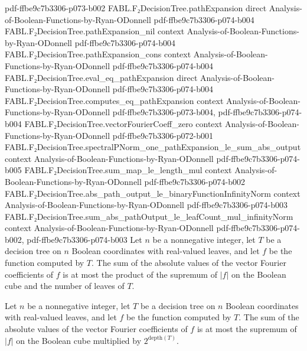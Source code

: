 \begin{theorem}
  {pdf-ffbe9c7b3306-p073-b002}
\proofstep
  {FABL.F₂DecisionTree.pathExpansion}
  {direct}
  {Analysis-of-Boolean-Functions-by-Ryan-ODonnell}
  {pdf-ffbe9c7b3306-p074-b004}
\proofstep
  {FABL.F₂DecisionTree.pathExpansion_nil}
  {context}
  {Analysis-of-Boolean-Functions-by-Ryan-ODonnell}
  {pdf-ffbe9c7b3306-p074-b004}
\proofstep
  {FABL.F₂DecisionTree.pathExpansion_cons}
  {context}
  {Analysis-of-Boolean-Functions-by-Ryan-ODonnell}
  {pdf-ffbe9c7b3306-p074-b004}
\proofstep
  {FABL.F₂DecisionTree.eval_eq_pathExpansion}
  {direct}
  {Analysis-of-Boolean-Functions-by-Ryan-ODonnell}
  {pdf-ffbe9c7b3306-p074-b004}
\proofstep
  {FABL.F₂DecisionTree.computes_eq_pathExpansion}
  {context}
  {Analysis-of-Boolean-Functions-by-Ryan-ODonnell}
  {pdf-ffbe9c7b3306-p073-b004,
    pdf-ffbe9c7b3306-p074-b004}
\proofstep
  {FABL.F₂DecisionTree.vectorFourierCoeff_zero}
  {context}
  {Analysis-of-Boolean-Functions-by-Ryan-ODonnell}
  {pdf-ffbe9c7b3306-p072-b001}
\proofstep
  {FABL.F₂DecisionTree.spectralPNorm_one_pathExpansion_le_sum_abs_output}
  {context}
  {Analysis-of-Boolean-Functions-by-Ryan-ODonnell}
  {pdf-ffbe9c7b3306-p074-b005}
\proofstep
  {FABL.F₂DecisionTree.sum_map_le_length_mul}
  {context}
  {Analysis-of-Boolean-Functions-by-Ryan-ODonnell}
  {pdf-ffbe9c7b3306-p074-b002}
\proofstep
  {FABL.F₂DecisionTree.abs_path_output_le_binaryFunctionInfinityNorm}
  {context}
  {Analysis-of-Boolean-Functions-by-Ryan-ODonnell}
  {pdf-ffbe9c7b3306-p074-b003}
\proofstep
  {FABL.F₂DecisionTree.sum_abs_pathOutput_le_leafCount_mul_infinityNorm}
  {context}
  {Analysis-of-Boolean-Functions-by-Ryan-ODonnell}
  {pdf-ffbe9c7b3306-p074-b002,
    pdf-ffbe9c7b3306-p074-b003}
Let $n$ be a nonnegative integer, let $T$ be a decision tree on $n$ Boolean coordinates
with real-valued leaves, and let $f$ be the function computed by $T$. The sum of the
absolute values of the vector Fourier coefficients of $f$ is at most the product of the
supremum of $|f|$ on the Boolean cube and the number of leaves of $T$.
\end{theorem}

\begin{theorem}
\leanok
{}
Let $n$ be a nonnegative integer, let $T$ be a decision tree on $n$ Boolean coordinates
with real-valued leaves, and let $f$ be the function computed by $T$. The sum of the
absolute values of the vector Fourier coefficients of $f$ is at most the supremum of
$|f|$ on the Boolean cube multiplied by $2^{\mathrm{depth}(T)}$.
\end{theorem}


